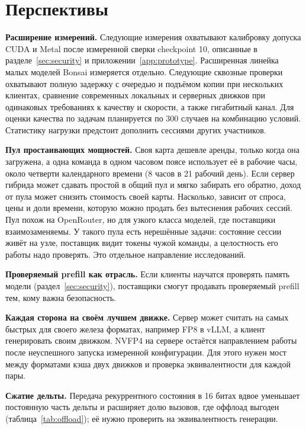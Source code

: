 \section{Перспективы}
\label{sec:outlook}

\textbf{Расширение измерений.} Следующие измерения охватывают калибровку допуска CUDA и Metal после измеренной сверки checkpoint 10, описанные в разделе~\ref{sec:security} и приложении~\ref{app:prototype}. Расширенная линейка малых моделей Bonsai измеряется отдельно.
Следующие сквозные проверки охватывают полную задержку с очередью и подъёмом копии при нескольких
клиентах, сравнение современных локальных и серверных движков при одинаковых требованиях к качеству
и скорости, а также гигабитный канал. Для оценки качества по задачам планируется по 300 случаев
на комбинацию условий. Статистику нагрузки предстоит дополнить сессиями других участников.

\textbf{Пул простаивающих мощностей.} Своя карта дешевле аренды, только когда она загружена, а одна команда в одном часовом поясе использует её в
рабочие часы, около четверти календарного времени (8 часов в 21 рабочий день). Если сервер гибрида может сдавать простой в общий пул и
мягко забирать его обратно, доход от пула может снизить стоимость своей карты. Насколько, зависит от спроса, цены и
доли времени, которую можно продать без вытеснения рабочих сессий. Пул похож на OpenRouter, но
для узкого класса моделей, где поставщики взаимозаменяемы. У такого пула есть нерешённые задачи: состояние сессии
живёт на узле, поставщик видит токены чужой команды, а целостность его работы надо проверять. Это отдельное
направление исследований.

\textbf{Проверяемый prefill как отрасль.} Если клиенты научатся проверять память модели (раздел~\ref{sec:security}),
поставщики смогут продавать проверяемый prefill тем, кому важна безопасность.

\textbf{Каждая сторона на своём лучшем движке.} Сервер может считать на самых быстрых для своего железа форматах,
например FP8 в vLLM, а клиент генерировать своим движком. NVFP4 на сервере остаётся направлением
работы после неуспешного запуска измеренной конфигурации. Для этого нужен мост между форматами кэша двух
движков и проверка эквивалентности для каждой пары.

\textbf{Сжатие дельты.} Передача рекуррентного состояния в 16 битах вдвое уменьшает постоянную часть дельты и
расширяет долю вызовов, где оффлоад выгоден (таблица~\ref{tab:offload}); её нужно проверить на эквивалентность
генерации.

